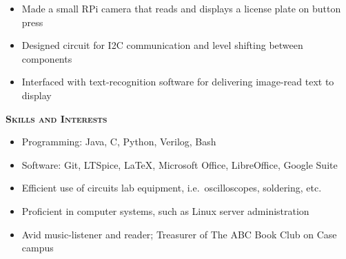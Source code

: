 \documentclass[12pt]{article}
\newcommand*{\titlefont}{\fontfamily{pnc}\selectfont}
\begin{document}
\vspace{-\topsep}
\begin{itemize}
    \setlength{\parskip}{0pt}
    \setlength{\itemsep}{0pt plus 1pt}
    \item Made a small RPi camera that reads and displays a license plate on button press
    \item Designed circuit for I2C communication and level shifting between components
    \item Interfaced with text-recognition software for delivering image-read text to display
\end{itemize}
\vspace{-\topsep}

\bigbreak{}

{\titlefont\large\textsc{\textbf{Skills and Interests}}}
\hrulefill{}\\
%
\vspace{-\topsep}
\begin{itemize}
    \setlength{\parskip}{0pt}
    \setlength{\itemsep}{0pt plus 1 pt}
    \item Programming: Java, C, Python, Verilog, Bash
    \item Software: Git, LTSpice, LaTeX, Microsoft Office, LibreOffice, Google Suite
    \item Efficient use of circuits lab equipment, i.e.\ oscilloscopes, soldering, etc.
    \item Proficient in computer systems, such as Linux server administration
    \item Avid music-listener and reader; Treasurer of The ABC Book Club on Case campus

\end{itemize}
\end{document}
